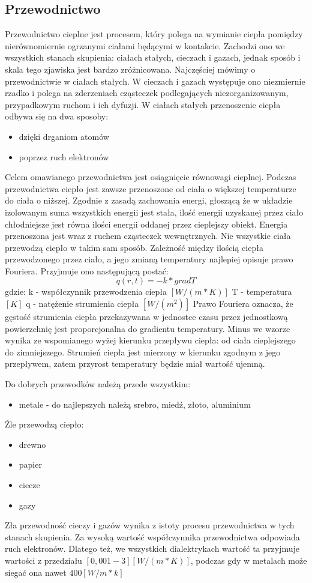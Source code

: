 \subsection {Przewodnictwo}
 Przewodnictwo cieplne jest procesem, który polega  na wymianie ciepła 
pomiędzy nierównomiernie ogrzanymi ciałami będącymi w kontakcie. Zachodzi ono we wszystkich stanach skupienia: ciałach stałych, cieczach i gazach, jednak sposób i skala tego zjawiska jest bardzo zróżnicowana. Najczęściej mówimy o przewodnictwie w ciałach stałych.
W cieczach i gazach występuje ono niezmiernie rzadko i polega na zderzeniach cząsteczek podlegających
niezorganizowanym, przypadkowym ruchom i ich dyfuzji.
W ciałach stałych przenoszenie ciepła odbywa się  na dwa sposoby:
\begin{itemize}
\item dzięki drganiom atomów
\item poprzez ruch elektronów
\end {itemize}
Celem omawianego przewodnictwa jest 
osiągnięcie równowagi cieplnej. Podczas przewodnictwa ciepło jest zawsze przenoszone od
ciała o większej temperaturze do ciała o niższej. Zgodnie z zasadą zachowania energi, głoszącą że w układzie 
izolowanym suma wszystkich energii jest stała, ilość energii uzyskanej przez ciało chłodniejsze jest równa
ilości energii oddanej przez cieplejszy obiekt. Energia przenoszona jest wraz z ruchem cząsteczek wewnętrznych.
Nie wszystkie ciała przewodzą ciepło w takim sam sposób.
Zależność między ilością ciepła przewodzonego przez ciało, a jego zmianą temperatury najlepiej opisuje prawo Fouriera.
Przyjmuje ono następującą postać:
\begin{equation}
 q(r,t)=-k*grad T
 \label{eqn:fourier}
\end {equation}
gdzie:
k - współczynnik przewodzenia ciepła $[W / (m*K)]$
T - temperatura $[K]$
q - natężenie strumienia ciepła  $[W/(m^2)]$
Prawo Fouriera oznacza, że gęstość strumienia ciepła przekazywana w jednostce czasu przez jednostkową powierzchnię 
jest proporcjonalna do gradientu temperatury. Minus we wzorze wynika ze wspomianego wyżej kierunku przepływu ciepła:
od ciała cieplejszego do zimniejszego. Strumień ciepła jest mierzony w kierunku zgodnym z jego przepływem, zatem przyrost
temperatury będzie miał wartość ujemną.


Do dobrych przewodków należą przede wszystkim:
\begin {itemize}
\item metale - do najlepszych należą srebro, miedź, złoto, aluminium
\end {itemize}
Źle przewodzą ciepło:
\begin {itemize}
\item drewno
\item papier
\item ciecze
\item gazy
\end {itemize}
Zła przewodność cieczy i gazów wynika z istoty procesu przewodnictwa w tych stanach skupienia. Za wysoką wartość 
współczynnika przewodnictwa odpowiada ruch elektronów. Dlatego też, we wszystkich dialektrykach wartość ta
przyjmuje wartości z przedziału $[0,001-3][W/(m*K)]$, podczas gdy w metalach może siegać ona nawet $ 400 [W/m*k]$

